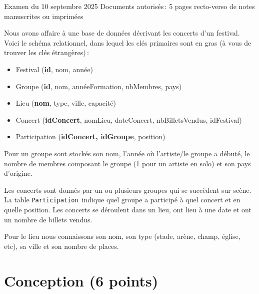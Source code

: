 %
{Examen du 10 septembre  2025}%
{Documents autorisés\,: 5 pages recto-verso de notes manuscrites ou imprimées}%


Nous avons affaire à une base de données décrivant les concerts d'un festival.
Voici le schéma 
 relationnel, dans lequel les clés primaires sont en gras
(à vous de trouver les clés étrangères)\,:


\begin{itemize}
    \item Festival (\textbf{id}, nom, année)
  \item Groupe (\textbf{id}, nom, annéeFormation, nbMembres, pays)
   \item Lieu (\textbf{nom}, type, ville, capacité)
   \item Concert (\textbf{idConcert}, nomLieu, dateConcert, nbBilletsVendus, idFestival)
   \item Participation (\textbf{idConcert, idGroupe}, position)
\end{itemize}

Pour un groupe sont stockés son nom, l'année où 
l'artiste/le groupe a débuté, le nombre de membres 
composant le groupe (1 pour un artiste en solo) et son pays d'origine.


Les concerts sont donnés par un ou plusieurs groupes qui se succèdent sur scène.
La table \texttt{Participation} indique quel groupe a participé à quel concert et en quelle position.
Les concerts se déroulent dans un lieu, ont lieu à une date 
et ont un nombre de billets vendus. 

Pour le lieu nous connaissons son nom, 
son type (stade, arène, champ, église, etc), 
sa ville et son nombre de places. 

\section{Conception (6 points)}

